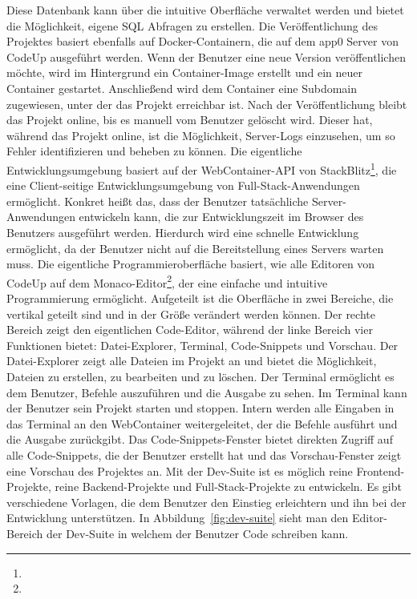 \documentclass[main.tex]{subfiles}
\begin{document}
    Diese Datenbank kann über die intuitive Oberfläche verwaltet werden und bietet die Möglichkeit, eigene SQL Abfragen zu erstellen.
    Die Veröffentlichung des Projektes basiert ebenfalls auf Docker-Containern, die auf dem app0 Server von CodeUp ausgeführt werden.
    Wenn der Benutzer eine neue Version veröffentlichen möchte, wird im Hintergrund ein Container-Image erstellt und ein neuer Container gestartet.
    Anschließend wird dem Container eine Subdomain zugewiesen, unter der das Projekt erreichbar ist.
    Nach der Veröffentlichung bleibt das Projekt online, bis es manuell vom Benutzer gelöscht wird.
    Dieser hat, während das Projekt online, ist die Möglichkeit, Server-Logs einzusehen, um so Fehler identifizieren und beheben zu können.
    Die eigentliche Entwicklungsumgebung basiert auf der WebContainer-API von StackBlitz\footnote{}, die eine Client-seitige Entwicklungsumgebung von Full-Stack-Anwendungen ermöglicht.
    Konkret heißt das, dass der Benutzer tatsächliche Server-Anwendungen entwickeln kann, die zur Entwicklungszeit im Browser des Benutzers ausgeführt werden.
    Hierdurch wird eine schnelle Entwicklung ermöglicht, da der Benutzer nicht auf die Bereitstellung eines Servers warten muss.
    Die eigentliche Programmieroberfläche basiert, wie alle Editoren von CodeUp auf dem Monaco-Editor\footnote{}, der eine einfache und intuitive Programmierung ermöglicht.
    Aufgeteilt ist die Oberfläche in zwei Bereiche, die vertikal geteilt sind und in der Größe verändert werden können.
    Der rechte Bereich zeigt den eigentlichen Code-Editor, während der linke Bereich vier Funktionen bietet: Datei-Explorer, Terminal, Code-Snippets und Vorschau.
    Der Datei-Explorer zeigt alle Dateien im Projekt an und bietet die Möglichkeit, Dateien zu erstellen, zu bearbeiten und zu löschen.
    Der Terminal ermöglicht es dem Benutzer, Befehle auszuführen und die Ausgabe zu sehen.
    Im Terminal kann der Benutzer sein Projekt starten und stoppen.
    Intern werden alle Eingaben in das Terminal an den WebContainer weitergeleitet, der die Befehle ausführt und die Ausgabe zurückgibt.
    Das Code-Snippets-Fenster bietet direkten Zugriff auf alle Code-Snippets, die der Benutzer erstellt hat und das Vorschau-Fenster zeigt eine Vorschau des Projektes an.
    Mit der Dev-Suite ist es möglich reine Frontend-Projekte, reine Backend-Projekte und Full-Stack-Projekte zu entwickeln.
    Es gibt verschiedene Vorlagen, die dem Benutzer den Einstieg erleichtern und ihn bei der Entwicklung unterstützen.
    In Abbildung~\ref{fig:dev-suite} sieht man den Editor-Bereich der Dev-Suite in welchem der Benutzer Code schreiben kann.
\end{document}
